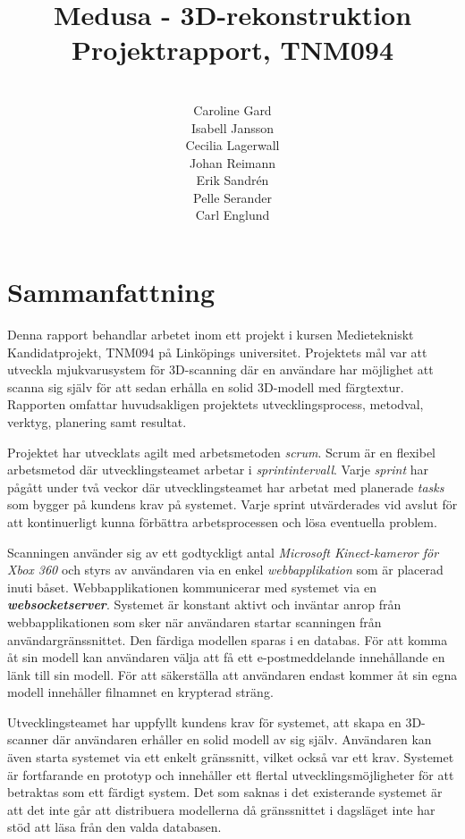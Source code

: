 \documentclass[a4paper,12pt,oneside,final]{extbook}
\title{Medusa - 3D-rekonstruktion\\Projektrapport, TNM094}
\author{\\Caroline Gard\\Isabell Jansson\\Cecilia Lagerwall\\Johan Reimann\\Erik Sandrén\\Pelle Serander\\Carl Englund}
\begin{document}
\pagestyle{empty}
\thispagestyle{empty}

\frontmatter

\maketitle

\newpage\null\thispagestyle{empty}\newpage
\setcounter{page}{1}
\pagestyle{fancy}

\chapter{Sammanfattning}
Denna rapport behandlar arbetet inom ett projekt i kursen Medietekniskt Kandidatprojekt, TNM094 på Linköpings universitet. Projektets mål var att utveckla mjukvarusystem för 3D-scanning där en användare har möjlighet att scanna sig själv för att sedan erhålla en solid 3D-modell med färgtextur. Rapporten omfattar huvudsakligen projektets utvecklingsprocess, metodval, verktyg, planering samt resultat.

Projektet har utvecklats agilt med arbetsmetoden \emph{scrum}. Scrum är en flexibel arbetsmetod där utvecklingsteamet arbetar i \emph{sprintintervall}. Varje \emph{sprint} har pågått under två veckor där utvecklingsteamet har arbetat med planerade \emph{tasks} som bygger på kundens krav på systemet. Varje sprint utvärderades vid avslut för att kontinuerligt kunna förbättra arbetsprocessen och lösa eventuella problem.

Scanningen använder sig av ett godtyckligt antal \emph{Microsoft Kinect-kameror för Xbox 360} och styrs av användaren via en enkel \emph{webbapplikation} som är placerad inuti båset. Webbapplikationen kommunicerar med systemet via en \emph{\textbf{websocketserver}}. Systemet är konstant aktivt och inväntar anrop från webbapplikationen som sker när användaren startar scanningen från användargränssnittet. Den färdiga modellen sparas i en databas. För att komma åt sin modell kan användaren välja att få ett e-postmeddelande innehållande en länk till sin modell. För att säkerställa att användaren endast kommer åt sin egna modell innehåller filnamnet en krypterad sträng.

Utvecklingsteamet har uppfyllt kundens krav för systemet, att skapa en 3D-scanner där användaren erhåller en solid modell av sig själv. Användaren kan även starta systemet via ett enkelt gränssnitt, vilket också var ett krav. Systemet är fortfarande en prototyp och innehåller ett flertal utvecklingsmöjligheter för att betraktas som ett färdigt system. Det som saknas i det existerande systemet är att det inte går att distribuera modellerna då gränssnittet i dagsläget inte har stöd att läsa från den valda databasen.
\end{document}
